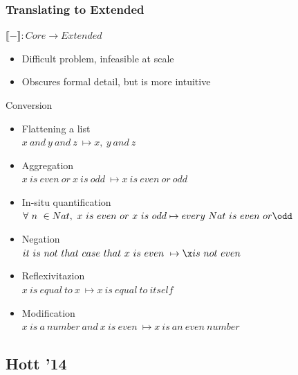 \documentclass[10pt]{beamer}
\begin{document}
\begin{frame}
\frametitle{Translating to Extended}

$\llbracket - \rrbracket : Core \to Extended$
\begin{itemize}
\item Difficult problem, infeasible at scale
\item Obscures formal detail, but is more intuitive 
\end{itemize}

\begin{exampleblock}{Conversion}
\begin{itemize}

\item Flattening a list \\
  $x\ and\ y\ and\ z\ \mapsto x,\ y\ and\ z$
\item Aggregation \\
  $x\ is\ even\ or\ x\ is\ odd\ \mapsto x\ is\ even\ or\ odd$
\item In-situ quantification \\
  $\forall\ n\ \in Nat,\ x\ is\ even\ or\ x\ is\ odd \mapsto every\ Nat\ is\ even\ or \odd$
\item Negation \\
  $it\ is\ not\ that\ case\ that\ x\ is\ even\ \mapsto \x is\ not\ even$
\item Reflexivitazion \\
  $x\ is\ equal\ to\ x\ \mapsto x\ is\ equal\ to\ itself$
\item Modification \\
  $x\ is\ a\ number\ and\ x\ is\ even\ \mapsto x\ is\ an\ even\ number$
\end{itemize}
\end{exampleblock}
\end{frame}


\subsection{Hott '14}

\end{document}
